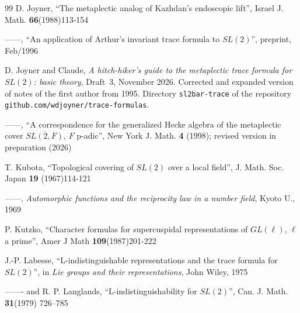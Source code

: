 \documentclass[12pt,letterpaper,openany]{book}
\theoremstyle{plain}
\theoremstyle{definition}
\theoremstyle{remark}
\theoremstyle{remark}
\begin{document}
\begin{thebibliography}{99}
 D. Joyner, ``The metaplectic analog of Kazhdan's
endoscopic lift'', Israel J. Math. \textbf{66}(1988)113-154

 ------, ``An application of Arthur's invariant
trace formula to $SL(2)$'', preprint, Feb/1996

 D. Joyner and Claude, \emph{A hitch-hiker's guide to
the metaplectic trace formula for $SL(2)$: basic theory}, Draft~3,
November 2026. Corrected and expanded version of notes of the first
author from 1995. Directory \texttt{sl2bar-trace} of the repository
\texttt{github.com/wdjoyner/trace-formulas}.

 ------, ``A correspondence for the generalized Hecke
algebra of the metaplectic cover $\overline{SL(2,F)}$, $F$ p-adic'',
New York J. Math. \textbf{4} (1998); revised version in preparation (2026)






 T. Kubota, ``Topological covering of $SL(2)$ over a
local field'', J.
Math. Soc. Japan \textbf{19} (1967)114-121

 ------, \emph{Automorphic functions and the reciprocity
law in a number field}, Kyoto U., 1969


 P. Kutzko,
``Character formulas for supercuspidal representations of
$GL(\ell)$, $\ell$ a prime'', Amer J Math \textbf{109}(1987)201-222

 J.-P. Labesse, ``L-indistinguishable representations
and the trace formula for $SL(2)$'', in
\emph{Lie groups and their representations}, John Wiley, 1975

 ------- and R. P. Langlands,
``L-indistinguishability for
$SL(2)$'', Can. J. Math. \textbf{31}(1979) 726--785


\end{thebibliography}
\end{document}
